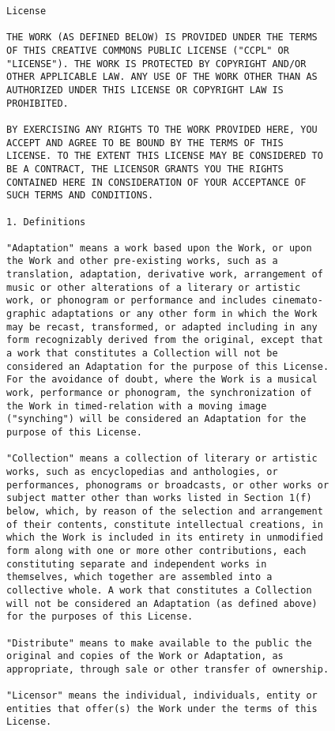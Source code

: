 \begin{verbatim}
License

THE WORK (AS DEFINED BELOW) IS PROVIDED UNDER THE TERMS
OF THIS CREATIVE COMMONS PUBLIC LICENSE ("CCPL" OR
"LICENSE"). THE WORK IS PROTECTED BY COPYRIGHT AND/OR
OTHER APPLICABLE LAW. ANY USE OF THE WORK OTHER THAN AS
AUTHORIZED UNDER THIS LICENSE OR COPYRIGHT LAW IS
PROHIBITED.

BY EXERCISING ANY RIGHTS TO THE WORK PROVIDED HERE, YOU
ACCEPT AND AGREE TO BE BOUND BY THE TERMS OF THIS
LICENSE. TO THE EXTENT THIS LICENSE MAY BE CONSIDERED TO
BE A CONTRACT, THE LICENSOR GRANTS YOU THE RIGHTS
CONTAINED HERE IN CONSIDERATION OF YOUR ACCEPTANCE OF
SUCH TERMS AND CONDITIONS.

1. Definitions

"Adaptation" means a work based upon the Work, or upon
the Work and other pre-existing works, such as a
translation, adaptation, derivative work, arrangement of
music or other alterations of a literary or artistic
work, or phonogram or performance and includes cinemato-
graphic adaptations or any other form in which the Work
may be recast, transformed, or adapted including in any
form recognizably derived from the original, except that
a work that constitutes a Collection will not be
considered an Adaptation for the purpose of this License.
For the avoidance of doubt, where the Work is a musical
work, performance or phonogram, the synchronization of
the Work in timed-relation with a moving image
("synching") will be considered an Adaptation for the
purpose of this License.

"Collection" means a collection of literary or artistic
works, such as encyclopedias and anthologies, or
performances, phonograms or broadcasts, or other works or
subject matter other than works listed in Section 1(f)
below, which, by reason of the selection and arrangement
of their contents, constitute intellectual creations, in
which the Work is included in its entirety in unmodified
form along with one or more other contributions, each
constituting separate and independent works in
themselves, which together are assembled into a
collective whole. A work that constitutes a Collection
will not be considered an Adaptation (as defined above)
for the purposes of this License.

"Distribute" means to make available to the public the
original and copies of the Work or Adaptation, as
appropriate, through sale or other transfer of ownership.

"Licensor" means the individual, individuals, entity or
entities that offer(s) the Work under the terms of this
License.


\end{verbatim}
